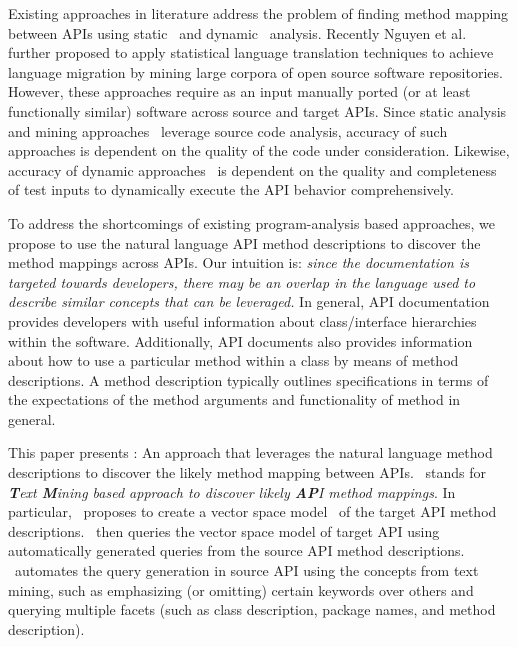 Existing approaches in literature
address the problem of finding method mapping between APIs using
static~\cite{Zhong2010ICSE} and dynamic~\cite{Gokhale2013ICSE} analysis. 
Recently Nguyen et al.~\cite{nguyen2014statistical} further proposed to
apply statistical language translation techniques to achieve language migration
by mining large corpora of open source software repositories.
However, these approaches require as an input manually ported
(or at least functionally similar) software across source and target APIs.
Since static analysis and mining approaches~\cite{Zhong2010ICSE,nguyen2014statistical}
leverage source code analysis, 
accuracy of such approaches is dependent on the quality of the code under consideration.
Likewise, accuracy of dynamic approaches~\cite{Gokhale2013ICSE} is dependent on
the quality and completeness of test inputs
to dynamically execute the API behavior comprehensively. 


To address the shortcomings of existing program-analysis based approaches,
we propose to use the natural language API method descriptions
to discover the method mappings across APIs.
Our intuition is:
\textit{since the documentation is targeted towards developers,
	there may be an overlap in the language used to describe similar concepts that can be leveraged.}
In general, API documentation provides developers with useful information
about class/interface hierarchies within the software.
Additionally, API documents also provides information about
how to use a particular method within a class by means of method descriptions.
A method description typically outlines specifications in terms of
the expectations of the method arguments and functionality of method in general.


This paper presents \tool : An approach that leverages the natural language method descriptions to discover the likely method mapping between APIs.
\tool\ stands for \textit{\textbf{T}ext \textbf{M}ining
	based approach to discover likely \textbf{AP}I method mappings}.
In particular, \tool\ proposes to create a vector space model~\cite{singhal2001modern,manning2008introduction} of the target API method descriptions. 
\tool\ then queries the vector space model of target API using
automatically generated queries from the source API method descriptions.
\tool\ automates the query generation in source API using the concepts from text mining, such as emphasizing (or omitting) certain keywords over others and querying multiple facets (such as class description, package names, and method description).


